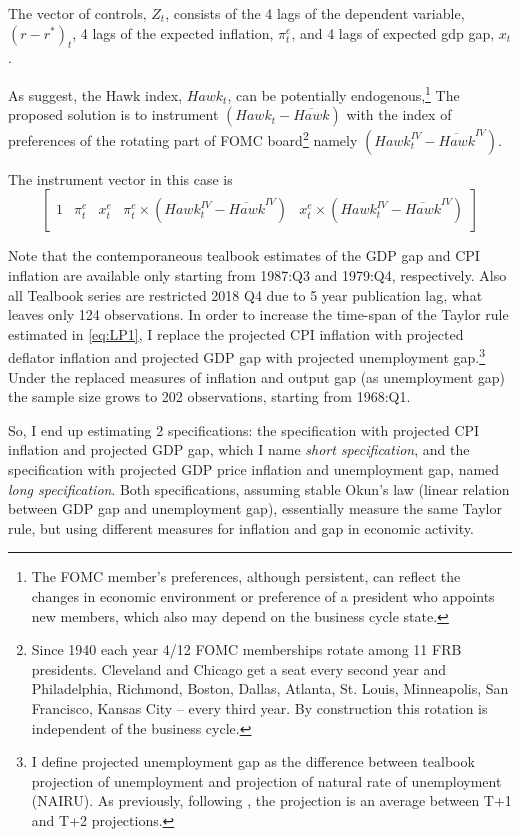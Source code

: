 \documentclass[11pt]{article}
\begin{document}
The vector of controls, $Z_t$, consists of the 4 lags of the dependent variable, $\left(r-r^*\right)_t$, 4 lags of the expected inflation, $\pi_t^e$, and 4 lags of expected gdp gap, $x_t$.

As \citet{HIM2023} suggest, the Hawk index, $\mathit{Hawk}_t$, can be potentially endogenous,\footnote{The FOMC member's preferences, although persistent, can reflect the changes in economic environment or preference of a president who appoints new members, which also may depend on the business cycle state.}
The proposed solution is to instrument $\left(\mathit{Hawk}_{t}-\overline{\mathit{Hawk}}\right)$ with the index of preferences of the rotating part of FOMC board\footnote{Since 1940 each year 4/12 FOMC memberships rotate among 11 FRB presidents. Cleveland and Chicago get a seat every second year and Philadelphia, Richmond, Boston, Dallas, Atlanta, St. Louis, Minneapolis, San Francisco, Kansas City -- every third year. By construction this rotation is independent of the business cycle.} namely $\left(\mathit{Hawk}_{t}^\mathit{IV}-\overline{\mathit{Hawk}}^\mathit{IV}\right)$.

The instrument vector in this case is 
\[\begin{bmatrix}
  1& \pi_t^e& x_t^e& \pi_t^e\times\left(\mathit{Hawk}_{t}^\mathit{IV}-\overline{\mathit{Hawk}}^\mathit{IV}\right)& x_t^e\times\left(\mathit{Hawk}_{t}^\mathit{IV}-\overline{\mathit{Hawk}}^\mathit{IV}\right)
\end{bmatrix}\]

Note that the contemporaneous tealbook estimates of the GDP gap and CPI inflation are available only starting from 1987:Q3 and 1979:Q4, respectively. 
Also all Tealbook series are restricted 2018 Q4 due to 5 year publication lag, what leaves only 124 observations. 
In order to increase the time-span of the Taylor rule estimated in \vref{eq:LP1}, I replace the projected CPI inflation with projected deflator inflation and projected GDP gap with projected unemployment gap.\footnote{I define projected unemployment gap as the difference between tealbook projection of unemployment and projection of natural rate of unemployment (NAIRU). As previously, following \citet{CoibionGorodnichenko2011}, the projection is an average between T+1 and T+2 projections.} Under the replaced measures of inflation and output gap (as unemployment gap) the sample size grows to 202 observations, starting from 1968:Q1.

So, I end up estimating 2 specifications: the specification with projected CPI inflation and projected GDP gap, which I name \emph{short specification}, and the specification with projected GDP price inflation and unemployment gap, named \emph{long specification}. 
Both specifications, assuming stable Okun's law (linear relation between GDP gap and unemployment gap), essentially measure the same Taylor rule, but using different measures for inflation and gap in economic activity. 
\end{document}
